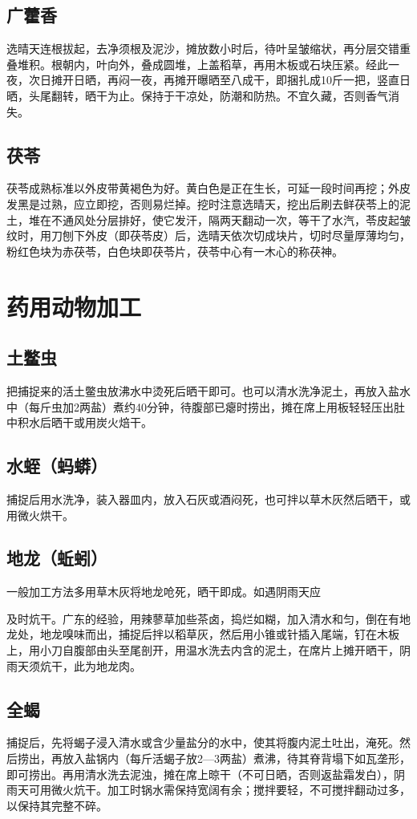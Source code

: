 \documentclass{ctexbook}
\begin{document}
\subsection{广藿香}
选晴天连根拔起，去净须根及泥沙，摊放数小时后，待叶呈皱缩状，再分层交错重叠堆积。根朝内，叶向外，叠成圆堆，上盖稻草，再用木板或石块压紧。经此一夜，次日摊开日晒，再闷一夜，再摊开曝晒至八成干，即捆扎成10斤一把，竖直日晒，头尾翻转，晒干为止。保持于干凉处，防潮和防热。不宜久藏，否则香气消失。

\subsection{茯苓}
茯苓成熟标准以外皮带黄褐色为好。黄白色是正在生长，可延一段时间再挖；外皮发黑是过熟，应立即挖，否则易烂掉。挖时注意选晴天，挖出后刷去鲜茯苓上的泥土，堆在不通风处分层排好，使它发汗，隔两天翻动一次，等干了水汽，苓皮起皱纹时，用刀刨下外皮（即茯苓皮）后，选晴天依次切成块片，切时尽量厚薄均匀，粉红色块为赤茯苓，白色块即茯苓片，茯苓中心有一木心的称茯神。
\section{药用动物加工}
\subsection{土鳖虫}
把捕捉来的活土鳖虫放沸水中烫死后晒干即可。也可以清水洗净泥土，再放入盐水中（每斤虫加2两盐）煮约40分钟，待腹部已瘪时捞出，摊在席上用板轻轻压出肚中积水后晒干或用炭火焙干。
\subsection{水蛭（蚂蟒）}
捕捉后用水洗净，装入器皿内，放入石灰或酒闷死，也可拌以草木灰然后晒干，或用微火烘干。
\subsection{地龙（蚯蚓）}
一般加工方法多用草木灰将地龙呛死，晒干即成。如遇阴雨天应

及时炕干。广东的经验，用辣蓼草加些茶卤，捣烂如糊，加入清水和匀，倒在有地龙处，地龙嗅味而出，捕捉后拌以稻草灰，然后用小锥或针插入尾端，钉在木板上，用小刀自腹部由头至尾剖开，用温水洗去内含的泥土，在席片上摊开晒干，阴雨天须炕干，此为地龙肉。
\subsection{全蝎}
捕捉后，先将蝎子浸入清水或含少量盐分的水中，使其将腹内泥土吐出，淹死。然后捞出，再放入盐锅内（每斤活蝎子放2—3两盐）煮沸，待其脊背塌下如瓦垄形，即可捞出。再用清水洗去泥浊，摊在席上晾干（不可日晒，否则返盐霜发白），阴雨天可用微火炕干。加工时锅水需保持宽阔有余；搅拌要轻，不可搅拌翻动过多，以保持其完整不碎。
\end{document}
